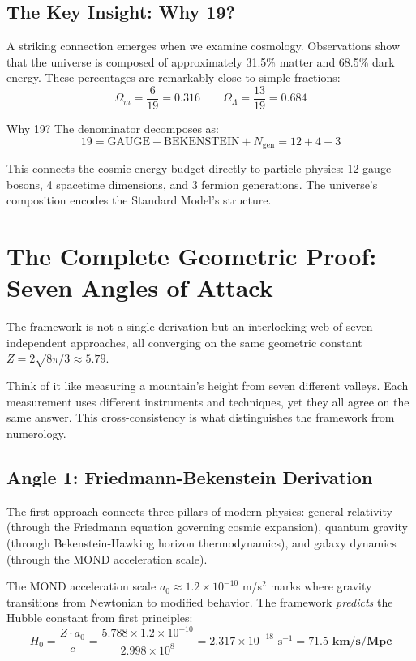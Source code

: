 \documentclass[11pt,a4paper]{article}
\theoremstyle{plain}
\theoremstyle{definition}
\theoremstyle{remark}
\newcommand{\Ngen}{N_{\text{gen}}}
\newcommand{\Omegam}{\Omega_m}
\newcommand{\OmegaL}{\Omega_\Lambda}
\newcommand{\GAUGE}{\text{GAUGE}}
\newcommand{\BEK}{\text{BEKENSTEIN}}
\begin{document}
\subsection{The Key Insight: Why 19?}

A striking connection emerges when we examine cosmology. Observations show that the universe is composed of approximately 31.5\% matter and 68.5\% dark energy. These percentages are remarkably close to simple fractions:
\[
\Omegam = \frac{6}{19} = 0.316 \qquad \OmegaL = \frac{13}{19} = 0.684
\]

Why 19? The denominator decomposes as:
\[
\boxed{19 = \GAUGE + \BEK + \Ngen = 12 + 4 + 3}
\]

This connects the cosmic energy budget directly to particle physics: 12 gauge bosons, 4 spacetime dimensions, and 3 fermion generations. The universe's composition encodes the Standard Model's structure.

\section{The Complete Geometric Proof: Seven Angles of Attack}

The framework is not a single derivation but an interlocking web of seven independent approaches, all converging on the same geometric constant $Z = 2\sqrt{8\pi/3} \approx 5.79$.

Think of it like measuring a mountain's height from seven different valleys. Each measurement uses different instruments and techniques, yet they all agree on the same answer. This cross-consistency is what distinguishes the framework from numerology.

\subsection{Angle 1: Friedmann-Bekenstein Derivation}

The first approach connects three pillars of modern physics: general relativity (through the Friedmann equation governing cosmic expansion), quantum gravity (through Bekenstein-Hawking horizon thermodynamics), and galaxy dynamics (through the MOND acceleration scale).

The MOND acceleration scale $a_0 \approx 1.2 \times 10^{-10}$ m/s$^2$ marks where gravity transitions from Newtonian to modified behavior. The framework \emph{predicts} the Hubble constant from first principles:
\[
H_0 = \frac{Z \cdot a_0}{c} = \frac{5.788 \times 1.2 \times 10^{-10}}{2.998 \times 10^8} = 2.317 \times 10^{-18} \text{ s}^{-1} = \mathbf{71.5 \text{ km/s/Mpc}}
\]
\end{document}
